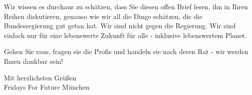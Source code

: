 \documentclass[a4paper, 11.5pt]{article}
\begin{document}
Wir wissen es durchaus zu schätzen, dass Sie diesen offen Brief lesen, ihn in Ihren Reihen diskutieren, genauso wie wir all die Dinge schätzen, die die Bundesregierung gut getan hat. Wir sind nicht gegen die Regierung. Wir sind einfach nur für eine lebenswerte Zukunft für alle - inklusive lebenswertem Planet.


Gehen Sie raus, fragen sie die Profis und handeln sie nach deren Rat - wir werden Ihnen dankbar sein! 

\vspace{\baselineskip}

Mit herzlichsten Grüßen \\

\vspace{-0.5\baselineskip}
Fridays For Future München
\end{document}
